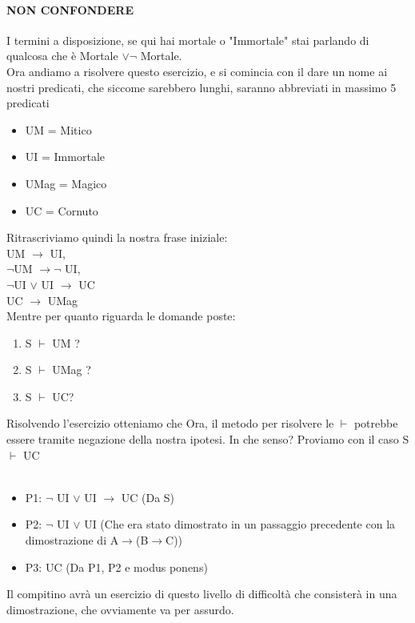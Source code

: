 \documentclass[12pt, a4paper, openany, oneside]{book}
\begin{document}
\paragraph{NON CONFONDERE} I termini a disposizione, se qui hai mortale o "Immortale"
stai parlando di qualcosa che è Mortale $\vee \neg$ Mortale. \\
Ora andiamo a risolvere questo esercizio, e si comincia con il dare un nome
ai nostri predicati, che siccome sarebbero lunghi, saranno abbreviati in massimo
5 predicati
\begin{itemize}
	\item UM = Mitico
	\item UI = Immortale 
	\item UMag = Magico
	\item UC = Cornuto
\end{itemize}
Ritrascriviamo quindi la nostra frase iniziale: \\
UM $\to$ UI, \\
$\neg$UM $\to \neg$ UI, \\
$\neg$UI $\vee$ UI $\to$ UC \\
UC $\to$ UMag \\
Mentre per quanto riguarda le domande poste:
\begin{enumerate}
	\item S $\vdash$ UM ?
	\item S $\vdash$ UMag ?
	\item S $\vdash$ UC?
\end{enumerate}
Risolvendo l'esercizio otteniamo che
Ora, il metodo per risolvere le $\vdash$ potrebbe essere tramite negazione della
nostra ipotesi. In che senso? Proviamo con il caso S $\vdash$ UC \\ \\
\begin{itemize}
	\item P1: $\neg$ UI $\vee$ UI $\to$ UC (Da S)
	\item P2: $\neg$ UI $\vee$ UI (Che era stato dimostrato in un passaggio 
	precedente con la dimostrazione di A$\to$(B$\to$C))
	\item P3: UC (Da P1, P2 e modus ponens)
\end{itemize} 
Il compitino avrà un esercizio di questo livello di difficoltà che consisterà in
una dimostrazione, che ovviamente va per assurdo.
\end{document}
